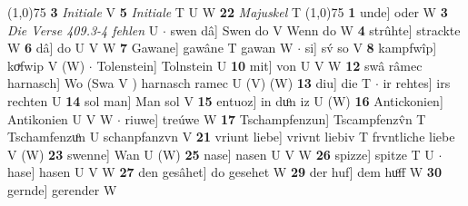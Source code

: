 \documentclass[8pt,a4paper,notitlepage]{article}
\begin{document}
\begin{table}[ht]
\begin{minipage}[t]{0.5\linewidth}
\line(1,0){75} \newline
\textbf{3} \textit{Initiale} V  \textbf{5} \textit{Initiale} T U W  \textbf{22} \textit{Majuskel} T  \newline
\line(1,0){75} \newline
\textbf{1} unde] oder W \textbf{3} \textit{Die Verse 409.3-4 fehlen} U   $\cdot$ swen dâ] Swen do V Wenn do W \textbf{4} strûhte] strackte W \textbf{6} dâ] do U V W \textbf{7} Gawane] gawâne T gawan W  $\cdot$ si] sv́ so V \textbf{8} kampfwîp] koͮfwip V (W)  $\cdot$ Tolenstein] Tolnstein U \textbf{10} mit] von U V W \textbf{12} swâ râmec harnasch] Wo (Swa V ) harnasch ramec U (V) (W) \textbf{13} diu] die T  $\cdot$ ir rehtes] irs rechten U \textbf{14} sol man] Man sol V \textbf{15} entuoz] in duͦn iz U (W) \textbf{16} Antickonien] Antikonien U V W  $\cdot$ riuwe] treúwe W \textbf{17} Tschampfenzun] Tscampfenzv̂n T Tschamfenzuͦn U schanpfanzvn V \textbf{21} vriunt liebe] vrivnt liebiv T frvntliche liebe V (W) \textbf{23} swenne] Wan U (W) \textbf{25} nase] nasen U V W \textbf{26} spizze] spitze T U  $\cdot$ hase] hasen U V W \textbf{27} den gesâhet] do gesehet W \textbf{29} der huf] dem huͦff W \textbf{30} gernde] gerender W \newline
\end{minipage}
\end{table}
\end{document}
